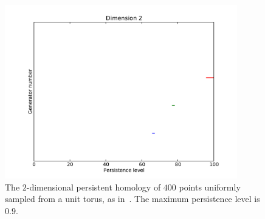 \documentclass[a4paper,10pt]{article}
\begin{document}
\begin{figure}[htpb]
  \centering
  \includegraphics[width=0.9\textwidth]{torus_d2}
  \caption{The $2$-dimensional persistent homology of $400$ points uniformly sampled from a unit torus, as in~\citep{javaplextut}. The maximum persistence level is $0.9$.} \label{fig:torus2}
\end{figure}



\end{document}
